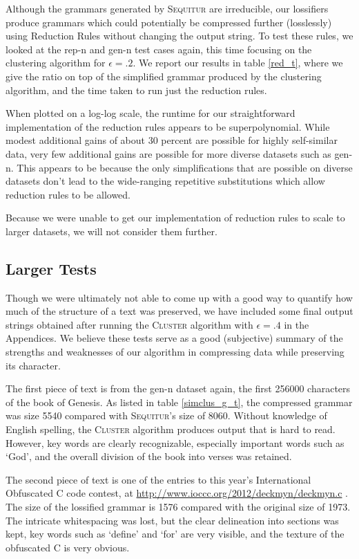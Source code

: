 \documentclass[11pt]{article}
\newcommand{\Sequitur}{\textsc{Sequitur}\xspace}
\newcommand{\Cluster}{\textsc{Cluster}\xspace}
\begin{document}
Although the grammars generated by \Sequitur are irreducible, our lossifiers
produce grammars which could potentially be compressed further (losslessly)
using Reduction Rules without changing the output string. To test these rules,
we looked at the rep-n and gen-n test cases again, this time focusing on the
clustering algorithm for $\epsilon = .2$. We report our results in table
\ref{red_t}, where we give the ratio on top of the simplified grammar produced
by the clustering algorithm, and the time taken to run just the reduction
rules.

When plotted on a log-log scale, the runtime for our straightforward
implementation of the reduction rules appears to be superpolynomial. While
modest additional gains of about 30 percent are possible for highly
self-similar data, very few additional gains are possible for more diverse
datasets such as gen-n. This appears to be because the only simplifications
that are possible on diverse datasets don't lead to the wide-ranging repetitive
substitutions which allow reduction rules to be allowed.

Because we were unable to get our implementation of reduction rules to scale to
larger datasets, we will not consider them further.

\subsection{Larger Tests}

Though we were ultimately not able to come up with a good way to quantify how
much of the structure of a text was preserved, we have included some final
output strings obtained after running the \Cluster algorithm with $\epsilon =
.4$ in the Appendices. We believe these tests serve as a good (subjective)
summary of the strengths and weaknesses of our algorithm in compressing data
while preserving its character.

The first piece of text is from the gen-n dataset again, the first 256000
characters of the book of Genesis. As listed in table \ref{simclus_g_t}, the
compressed grammar was size 5540 compared with \Sequitur's size of 8060.
Without knowledge of English spelling, the \Cluster algorithm produces output
that is hard to read. However, key words are clearly recognizable, especially
important words such as `God', and the overall division of the book into verses
was retained.

The second piece of text is one of the entries to this year's International
Obfuscated C code contest, at \url{http://www.ioccc.org/2012/deckmyn/deckmyn.c}
.  The size of the lossified grammar is 1576 compared with the original size of
1973. The intricate whitespacing was lost, but the clear delineation into
sections was kept, key words such as `define' and `for' are very visible, and
the texture of the obfuscated C is very obvious.
\end{document}
